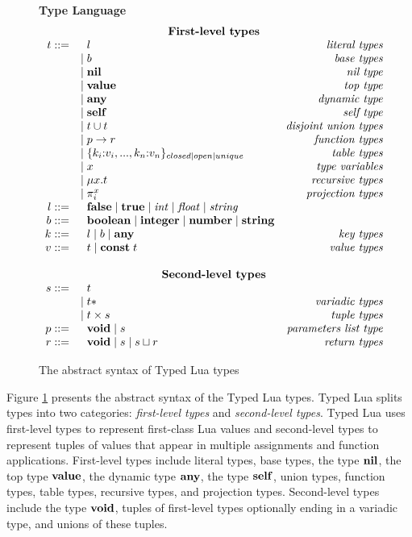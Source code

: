 \begin{figure}[!ht]
\textbf{Type Language}\\
\dstart
$$
\begin{array}{rlr}
\multicolumn{3}{c}{\textbf{First-level types}}\\
t ::= & \;\; l & \textit{literal types}\\
& | \; b & \textit{base types}\\
& | \; \Nil & \textit{nil type}\\
& | \; \Value & \textit{top type}\\
& | \; \Any & \textit{dynamic type}\\
& | \; \Self & \textit{self type}\\
& | \; t \cup t & \textit{disjoint union types}\\
& | \; p \rightarrow r & \textit{function types}\\
& | \; \{k_{i}{:}v_{i}, ..., k_{n}{:}v_{n}\}_{closed|open|unique} & \textit{table types}\\
& | \; x & \textit{type variables}\\
& | \; \mu x.t & \textit{recursive types}\\
& | \; \pi_{i}^{x} & \textit{projection types}\\
l ::= & \;\; \False \; | \; \True \; | \; {\it int} \; | \; {\it float} \; | \; {\it string} & \\
b ::= & \;\; \Boolean \; | \; \Integer \; | \; \Number \; | \; \String & \\
k ::= & \;\; l \; | \; b \; | \; \Any & \textit{key types}\\
v ::= & \;\; t \; | \; \Const \; t & \textit{value types}\\ 
\multicolumn{3}{c}{}\\
\multicolumn{3}{c}{\textbf{Second-level types}}\\
s ::= & \;\; t &\\
& | \; t* & \textit{variadic types}\\
& | \; t \times s & \textit{tuple types}\\
p ::= & \;\; \Void \; | \; s & \textit{parameters list type}\\
r ::= & \;\; \Void \; | \; s \; | \; s \sqcup r & \textit{return types}\\
\end{array}
$$
\dend
\caption{The abstract syntax of Typed Lua types}
\label{fig:typelang}
\end{figure}

Figure \ref{fig:typelang} presents the abstract syntax of the
Typed Lua types.
Typed Lua splits types into two categories:
\emph{first-level types} and \emph{second-level types}.
Typed Lua uses first-level types to represent first-class Lua values and
second-level types to represent tuples of values that appear in 
multiple assignments and function applications.
First-level types include literal types, base types, the type $\mathbf{nil}$,
the top type $\mathbf{value}$, the dynamic type $\mathbf{any}$, the type $\mathbf{self}$,
union types, function types, table types, recursive types, and
projection types.
Second-level types include the type $\mathbf{void}$, tuples of first-level
types optionally ending in a variadic type, and unions of these tuples.

